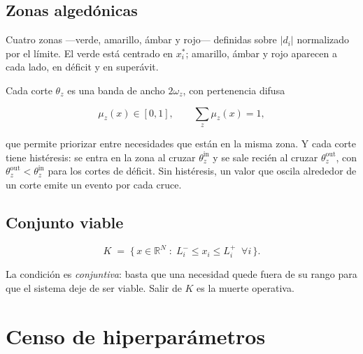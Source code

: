\documentclass[11pt,a4paper]{article}
\newcommand{\Real}{\mathbb{R}}
\begin{document}
\subsection{Zonas algedónicas}

Cuatro zonas —verde, amarillo, ámbar y rojo— definidas sobre $|d_i|$ normalizado por el
límite. El verde está centrado en $x_i^{*}$; amarillo, ámbar y rojo aparecen a cada lado,
en déficit y en superávit.

Cada corte $\theta_z$ es una banda de ancho $2\omega_z$, con pertenencia difusa

\begin{equation}
  \mu_z(x) \in [0,1], \qquad \sum_z \mu_z(x) = 1,
\end{equation}

que permite priorizar entre necesidades que están en la misma zona. Y cada corte tiene
histéresis: se entra en la zona al cruzar $\theta_z^{\text{in}}$ y se sale recién al
cruzar $\theta_z^{\text{out}}$, con $\theta_z^{\text{out}} < \theta_z^{\text{in}}$ para
los cortes de déficit. Sin histéresis, un valor que oscila alrededor de un corte emite un
evento por cada cruce.

\subsection{Conjunto viable}

\begin{equation}
  K \;=\; \Big\{\, x \in \Real^{N} \;:\; L_i^{-} \le x_i \le L_i^{+} \;\; \forall i \,\Big\} .
\end{equation}

La condición es \emph{conjuntiva}: basta que una necesidad quede fuera de su rango para
que el sistema deje de ser viable. Salir de $K$ es la muerte operativa.

\section{Censo de hiperparámetros}
\end{document}
